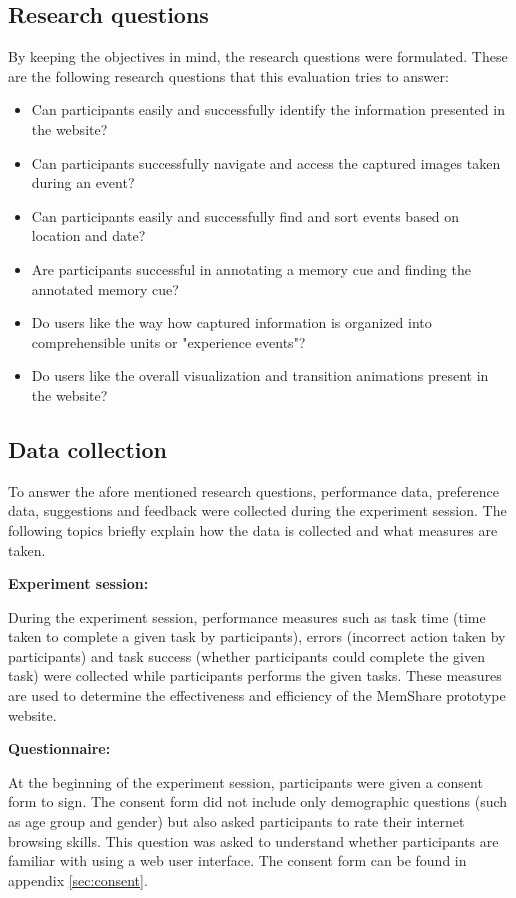 \documentclass[mscthesis]{usiinfthesis}
\begin{document}
\subsection{Research questions}
By keeping the objectives in mind, the research questions were formulated. These are the following research questions that this evaluation tries to answer:  
\begin{itemize}
\item Can participants easily and successfully identify the information presented in the website? 
\item Can participants successfully navigate and access the captured images taken during an event?
\item Can participants easily and successfully find and sort events based on location and date?
\item Are participants successful in annotating a memory cue and finding the annotated memory cue?
\item Do users like the way how captured information is organized into comprehensible units or "experience events"?
\item Do users like the overall visualization and transition animations present in the website? 
\end{itemize}

\subsection{Data collection}

To answer the afore mentioned research questions, performance data, preference data, suggestions and feedback were collected during the experiment session. The following topics briefly explain how the data is collected and what measures are taken.
\newline

\textbf{Experiment session:}

During the experiment session, performance measures such as task time (time taken to complete a given task by participants), errors (incorrect action taken by participants) and task success (whether participants could complete the given task) were collected while participants performs the given tasks. These measures are used to determine the effectiveness and efficiency of the MemShare prototype website. 
\newline

\textbf{Questionnaire:} 

At the beginning of the experiment session, participants were given a consent form to sign. The consent form did not include only demographic questions (such as age group and gender) but also asked participants to rate their internet browsing skills. This question was asked to understand whether participants are familiar with using a web user interface. The consent form can be found in appendix \ref{sec:consent}.
\end{document}
